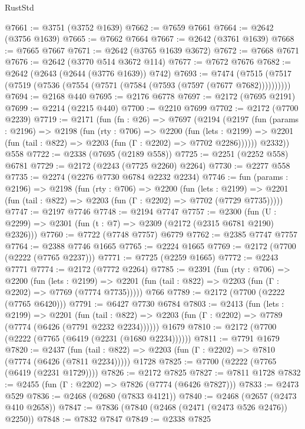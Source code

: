 \begin{lexlean}{RustStd}
\begin{coremodule}
@7661 := @3751 (@3752 @1639)
@7662 := @7659 @7661
@7664 := @2642 (@3756 @1639)
@7665 := @7662 @7664
@7667 := @2642 (@3761 @1639)
@7668 := @7665 @7667
@7671 := @2642 (@3765 @1639 @3672)
@7672 := @7668 @7671
@7676 := @2642 (@3770 @514 @3672 @114)
@7677 := @7672 @7676
@7682 := @2642 (@2643 (@2644 (@3776 @1639)) @742)
@7693 := @7474 (@7515 (@7517 (@7519 (@7536 (@7554 (@7571 (@7584 (@7593 (@7597 (@7677 @7682))))))))))
@7694 := @2168 @440
@7695 := @2176 @6778
@7697 := @2172 (@7695 @2191)
@7699 := @2214 (@2215 @440)
@7700 := @2210 @7699
@7702 := @2172 (@7700 @2239)
@7719 := @2171
    (fun (fn : @26) =>
    @7697
      (@2194
        (@2197
          (fun (params : @2196) =>
          @2198
            (fun (rty : @706) =>
            @2200
              (fun (lets : @2199) =>
              @2201 (fun (tail : @822) => @2203 (fun (Γ : @2202) => @7702 @2286))))))
        @2332))
    @558
@7722 := @2338 (@7695 (@2189 @558))
@7725 := @2251 (@2252 @558) @6781
@7729 := @2172 (@2243 (@7725 @2260) @2264)
@7730 := @2277 @558
@7735 := @2274 (@2276 @7730 @6784 @2232 @2234)
@7746 := fun (params : @2196) =>
  @2198
    (fun (rty : @706) =>
    @2200
      (fun (lets : @2199) =>
      @2201 (fun (tail : @822) => @2203 (fun (Γ : @2202) => @7702 (@7729 @7735)))))
@7747 := @2197 @7746
@7748 := @2194 @7747
@7757 := @2300 (fun (U : @2299) => @2301 (fun (t : @7) => @2309 (@2172 (@2315 @6781 @2190) @2326)))
@7760 := @7722 (@7748 @7757) @6779
@7762 := @2385 @7747 @7757
@7764 := @2388 @7746 @1665
@7765 := @2224 @1665
@7769 := @2172 (@7700 (@2222 (@7765 @2237)))
@7771 := @7725 (@2259 @1665)
@7772 := @2243 @7771
@7774 := @2172 (@7772 @2264)
@7785 := @2391
    (fun (rty : @706) =>
    @2200
      (fun (lets : @2199) =>
      @2201 (fun (tail : @822) => @2203 (fun (Γ : @2202) => @7769 (@7774 @7735)))))
    @766
@7789 := @2172 (@7700 (@2222 (@7765 @6420)))
@7791 := @6427 @7730 @6784
@7803 := @2413
    (fun (lets : @2199) =>
    @2201
      (fun (tail : @822) => @2203 (fun (Γ : @2202) => @7789 (@7774 (@6426 (@7791 @2232 @2234))))))
    @1679
@7810 := @2172 (@7700 (@2222 (@7765 (@6419 (@2231 (@1680 @2234))))))
@7811 := @7791 @1679
@7820 := @2437
    (fun (tail : @822) => @2203 (fun (Γ : @2202) => @7810 (@7774 (@6426 (@7811 @2234)))))
    @1728
@7825 := @7700 (@2222 (@7765 (@6419 (@2231 @1729))))
@7826 := @2172 @7825
@7827 := @7811 @1728
@7832 := @2455 (fun (Γ : @2202) => @7826 (@7774 (@6426 @7827)))
@7833 := @2473 @529
@7836 := @2468 (@2680 (@7833 @4121))
@7840 := @2468 (@2657 (@2473 @410 @2658))
@7847 := @7836 (@7840 (@2468 (@2471 (@2473 @526 @2476)) @2250))
@7848 := @7832 @7847
@7849 := @2338 @7825

\end{coremodule}
\end{lexlean}
